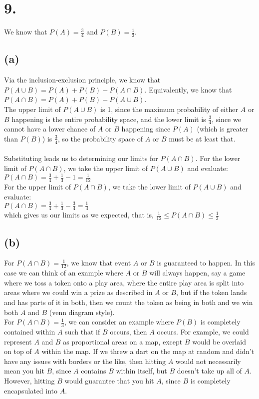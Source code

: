 \documentclass{article}
\begin{document}
\section*{9.}
{\Large 
We know that $P(A) = \frac{3}{4}$ and $P(B) = \frac{1}{3}$.

\subsection*{(a)}
Via the inclusion-exclusion principle, we know that $P(A \cup B) = P(A) + P(B) - P(A \cap B)$. Equivalently, we know that $P(A \cap B) = P(A) + P(B) - P(A \cup B)$. \\
The upper limit of $P(A \cup B)$ is 1, since the maximum probability of either $A$ or $B$ happening is the entire probability space, and the lower limit is $\frac{3}{4}$, since we cannot have a lower chance of $A$ or $B$ happening since $P(A)$ (which is greater than $P(B)$) is $\frac{3}{4}$, so the probability space of $A$ or $B$ must be at least that. \\ \\
Substituting leads us to determining our limits for $P(A \cap B)$. For the lower limit of $P(A \cap B)$, we take the upper limit of $P(A \cup B)$ and evaluate: \\
$P(A \cap B) = \frac{3}{4} + \frac{1}{3} - 1 = \frac{1}{12}$\\
For the upper limit of $P(A \cap B)$, we take the lower limit of $P(A \cup B)$ and evaluate: \\
$P(A \cap B) = \frac{3}{4} + \frac{1}{3} - \frac{3}{4} = \frac{1}{3}$ \\ 
which gives us our limits as we expected, that is, $\frac{1}{12} \leq P(A \cap B) \leq \frac{1}{3}$

\subsection*{(b)}
For $P(A \cap B) = \frac{1}{12}$, we know that event $A$ or $B$ is guaranteed to happen. In this case we can think of an example where $A$ or $B$ will always happen, say a game where we toss a token onto a play area, where the entire play area is split into areas where we could win a prize as described in  $A$ or $B$, but if the token lands and has parts of it in both, then we count the token as being in both and we win both $A$ and $B$ (venn diagram style). \\ 
For $P(A \cap B) = \frac{1}{3}$, we can consider an example where $P(B)$ is completely contained within $A$ such that if $B$ occurs, then $A$ occurs. For example, we could represent $A$ and $B$ as proportional areas on a map, except $B$ would be overlaid on top of $A$ within the map. If we threw a dart on the map at random and didn't have any issues with borders or the like, then hitting $A$ would not necessarily mean you hit $B$, since $A$ contains $B$ within itself, but $B$ doesn't take up all of $A$. However, hitting $B$ would guarantee that you hit $A$, since $B$ is completely encapsulated into $A$.

}
\end{document}
